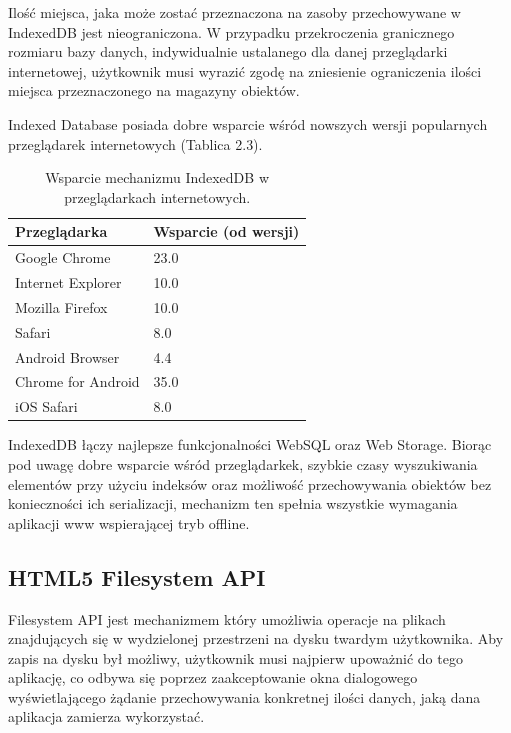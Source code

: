 Ilość miejsca, jaka może zostać przeznaczona na zasoby przechowywane w IndexedDB jest nieograniczona. W przypadku przekroczenia granicznego rozmiaru bazy danych, indywidualnie ustalanego dla danej przeglądarki internetowej, użytkownik musi wyrazić zgodę na zniesienie ograniczenia ilości miejsca przeznaczonego na magazyny obiektów.

Indexed Database posiada dobre wsparcie wśród nowszych wersji popularnych przeglądarek internetowych (Tablica 2.3).

\begin{table}[h]
\centering
    \begin{tabular}{ | p{8cm} | p{6cm} | }
    \hline
    \textbf{Przeglądarka} & \textbf{Wsparcie (od wersji)} \\ \hline
	Google Chrome & 23.0
	\\ \hline
	Internet Explorer & 10.0
	\\ \hline
	Mozilla Firefox & 10.0
	\\ \hline
	Safari & 8.0
	\\ \hline
	Android Browser & 4.4
	\\ \hline
	Chrome for Android & 35.0
	\\ \hline
	iOS Safari & 8.0
	\\ \hline
    \end{tabular}
	\caption{Wsparcie mechanizmu IndexedDB w przeglądarkach internetowych.}
\end{table}

IndexedDB łączy najlepsze funkcjonalności WebSQL oraz Web Storage. Biorąc pod uwagę dobre wsparcie wśród przeglądarkek, szybkie czasy wyszukiwania elementów przy użyciu indeksów oraz możliwość przechowywania obiektów bez konieczności ich serializacji, mechanizm ten spełnia wszystkie wymagania aplikacji www wspierającej tryb offline.

\subsection{HTML5 Filesystem API}
\label{sec:html5filesystemApi}

Filesystem API\cite{filesystemApi} jest mechanizmem który umożliwia operacje na plikach znajdujących się w wydzielonej przestrzeni na dysku twardym użytkownika. Aby zapis na dysku był możliwy, użytkownik musi najpierw upoważnić do tego aplikację, co odbywa się poprzez zaakceptowanie okna dialogowego wyświetlającego żądanie przechowywania konkretnej ilości danych, jaką dana aplikacja zamierza wykorzystać.


